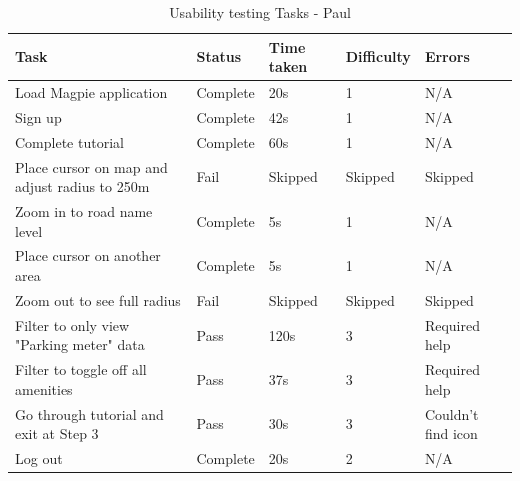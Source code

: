 \begin{table}[h!]
    \centering
    \caption{Usability testing Tasks - Paul}
    \begin{tabular}{|p{}|p{}|p{}|p{}|p{}|}
        \hline
        \textbf{Task}                                 & \textbf{Status} & \textbf{Time taken} & \textbf{Difficulty} & \textbf{Errors}    \\
        \hline
        Load Magpie application                       & Complete        & 20s                 & 1                   & N/A                \\
        \hline
        Sign up                                       & Complete        & 42s                 & 1                   & N/A                \\
        \hline
        Complete tutorial                             & Complete        & 60s                 & 1                   & N/A                \\
        \hline
        Place cursor on map and adjust radius to 250m & Fail            & Skipped             & Skipped             & Skipped            \\
        \hline
        Zoom in to road name level                    & Complete        & 5s                  & 1                   & N/A                \\
        \hline
        Place cursor on another area                  & Complete        & 5s                  & 1                   & N/A                \\
        \hline
        Zoom out to see full radius                   & Fail            & Skipped             & Skipped             & Skipped            \\
        \hline
        Filter to only view "Parking meter" data      & Pass            & 120s                & 3                   & Required help      \\
        \hline
        Filter to toggle off all amenities            & Pass            & 37s                 & 3                   & Required help      \\
        \hline
        Go through tutorial and exit at Step 3        & Pass            & 30s                 & 3                   & Couldn't find icon \\
        \hline
        Log out                                       & Complete        & 20s                 & 2                   & N/A                \\
        \hline
    \end{tabular}
\end{table}


